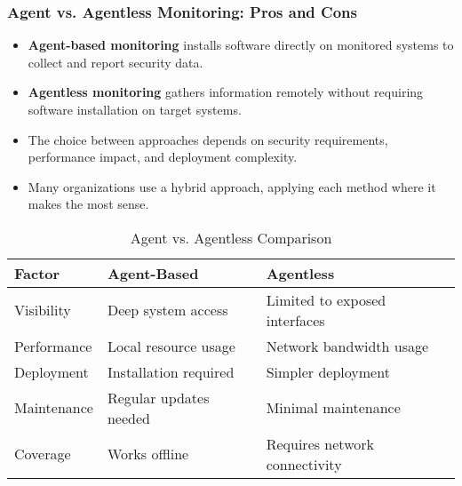 \documentclass{beamer}
\begin{document}
\begin{frame}
\frametitle{Agent vs. Agentless Monitoring: Pros and Cons}
\begin{itemize}
\item \textbf{Agent-based monitoring} installs software directly on monitored systems to collect and report security data.
\item \textbf{Agentless monitoring} gathers information remotely without requiring software installation on target systems.
\item The choice between approaches depends on security requirements, performance impact, and deployment complexity.
\item Many organizations use a hybrid approach, applying each method where it makes the most sense.
\end{itemize}

\begin{table}
\scriptsize
\begin{tabular}{lll}
\toprule
\textbf{Factor} & \textbf{Agent-Based} & \textbf{Agentless} \\
\midrule
Visibility & Deep system access & Limited to exposed interfaces \\
Performance & Local resource usage & Network bandwidth usage \\
Deployment & Installation required & Simpler deployment \\
Maintenance & Regular updates needed & Minimal maintenance \\
Coverage & Works offline & Requires network connectivity \\
\bottomrule
\end{tabular}
\caption{Agent vs. Agentless Comparison}
\end{table}
\end{frame}
\end{document}
